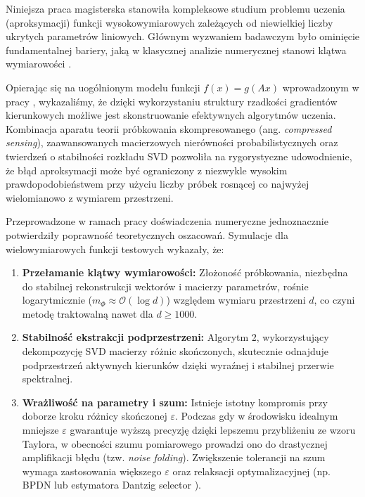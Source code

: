 
Niniejsza praca magisterska stanowiła kompleksowe studium problemu uczenia (aproksymacji) funkcji wysokowymiarowych zależących od niewielkiej liczby ukrytych parametrów liniowych. Głównym wyzwaniem badawczym było ominięcie fundamentalnej bariery, jaką w klasycznej analizie numerycznej stanowi klątwa wymiarowości \cite{novak2008tractability}. 

Opierając się na uogólnionym modelu funkcji $f(x) = g(Ax)$ wprowadzonym w pracy \cite{fornasier2012learning}, wykazaliśmy, że dzięki wykorzystaniu struktury rzadkości gradientów kierunkowych możliwe jest skonstruowanie efektywnych algorytmów uczenia. Kombinacja aparatu teorii próbkowania skompresowanego (ang. \textit{compressed sensing}), zaawansowanych macierzowych nierówności probabilistycznych \cite{tropp2012user} oraz twierdzeń o stabilności rozkładu SVD \cite{wedin1972perturbation} pozwoliła na rygorystyczne udowodnienie, że błąd aproksymacji może być ograniczony z niezwykle wysokim prawdopodobieństwem przy użyciu liczby próbek rosnącej co najwyżej wielomianowo z wymiarem przestrzeni.

Przeprowadzone w ramach pracy doświadczenia numeryczne jednoznacznie potwierdziły poprawność teoretycznych oszacowań. Symulacje dla wielowymiarowych funkcji testowych wykazały, że:
\begin{enumerate}
    \item \textbf{Przełamanie klątwy wymiarowości:} Złożoność próbkowania, niezbędna do stabilnej rekonstrukcji wektorów i macierzy parametrów, rośnie logarytmicznie ($m_\Phi \approx \mathcal{O}(\log d)$) względem wymiaru przestrzeni $d$, co czyni metodę traktowalną nawet dla $d \ge 1000$.
    \item \textbf{Stabilność ekstrakcji podprzestrzeni:} Algorytm 2, wykorzystujący dekompozycję SVD macierzy różnic skończonych, skutecznie odnajduje podprzestrzeń aktywnych kierunków dzięki wyraźnej i stabilnej przerwie spektralnej.
    \item \textbf{Wrażliwość na parametry i szum:} Istnieje istotny kompromis przy doborze kroku różnicy skończonej $\varepsilon$. Podczas gdy w środowisku idealnym mniejsze $\varepsilon$ gwarantuje wyższą precyzję dzięki lepszemu przybliżeniu ze wzoru Taylora, w obecności szumu pomiarowego prowadzi ono do drastycznej amplifikacji błędu (tzw. \textit{noise folding}). Zwiększenie tolerancji na szum wymaga zastosowania większego $\varepsilon$ oraz relaksacji optymalizacyjnej (np. BPDN lub estymatora Dantzig selector \cite{candes2007dantzig}).
\end{enumerate}

